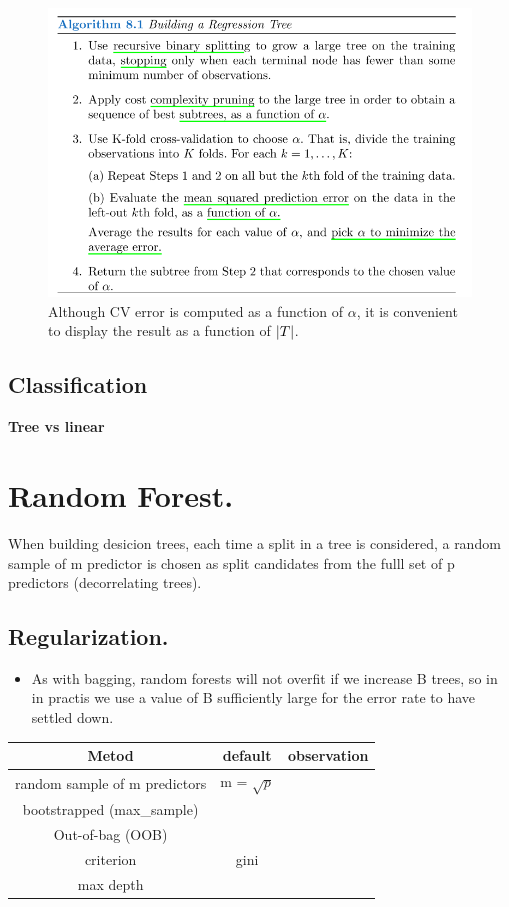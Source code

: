 \documentclass[12pt, a4paper]{book}
\begin{document}
\begin{figure}[H]
	\centering
	\includegraphics[scale=0.5]{regressionTree.png}
	\caption{Although CV error is computed as a function of $\alpha$, it is convenient to display the result as a function of $\abs{T}$.}
\end{figure}
\section{Classification} 
\textbf{Tree vs linear}

\chapter{Random Forest.}
When building desicion trees, each time a split in a tree is considered, a random sample of m predictor is chosen as split candidates from the fulll set of p predictors (decorrelating trees).
\section{Regularization.}
\begin{itemize}
	\item As with bagging, random forests will not overfit if we increase B trees, so in in practis we use a value of B sufficiently large for the error rate to have settled down.
\end{itemize}
\begin{table}[H]
	\centering
	\begin{tabular}{|c|c|c|}
		\hline 
		Metod & default & observation \\
		\hline 
		random sample of m predictors & m = $\sqrt{p}$ & \\
		\hline 
		bootstrapped (max\_sample) &&\\
		\hline
		Out-of-bag (OOB)&&\\
		\hline
		criterion &gini&\\
		\hline 
		max depth &&\\
		\hline 
	\end{tabular}
\end{table}
\end{document}
